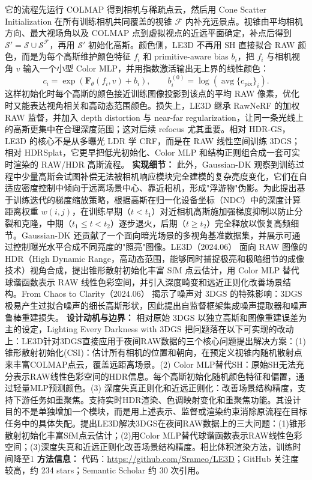 它的流程先运行 COLMAP 得到相机与稀疏点云，然后用 Cone Scatter Initialization 在所有训练相机共同覆盖的视锥 $\mathcal{F}$ 内补充远景点。视锥由平均相机方向、最大视场角以及 COLMAP 点到虚拟视点的近远平面确定，补点后得到 $\mathcal{S}'=\mathcal{S}\cup\mathcal{S}^{\mathcal{F}}$，再用 $\mathcal{S}'$ 初始化高斯。颜色侧，LE3D 不再用 SH 直接拟合 RAW 颜色，而是为每个高斯维护颜色特征 $f_i$ 和 primitive-aware bias $b_i$，把 $f_i$ 与相机视角 $v$ 输入一个小型 Color MLP，并用指数激活输出无上界的线性颜色：
\begin{equation}
c_i=\exp\left(\mathbf{F}_{\theta}(f_i,v)+b_i\right),\qquad
b_i^{(0)}=\log\left(\operatorname{avg}\{c_{\mathrm{pix}}\}_i\right).
\end{equation}
这样初始化时每个高斯的颜色接近训练图像投影到该点的平均 RAW 像素，优化时又能表达视角相关和高动态范围颜色。损失上，LE3D 继承 RawNeRF 的加权 RAW 监督，并加入 depth distortion 与 near-far regularization，让同一条光线上的高斯更集中在合理深度范围；这对后续 refocus 尤其重要。相对 HDR-GS，LE3D 的核心不是从多曝光 LDR 学 CRF，而是在 RAW 线性空间训练 3DGS；相对 HDRSplat，它更早把低光初始化、Color MLP 和结构正则组合成一套可实时渲染的 RAW/HDR 高斯流程。
\textbf{实现细节：} 此外，Gaussian-DK 观察到训练过程中少量高斯会试图补偿无法被相机响应模块完全建模的复杂亮度变化，它们在自适应密度控制中倾向于远离场景中心、靠近相机，形成"浮游物"伪影。为此提出基于训练迭代的梯度缩放策略，根据高斯在归一化设备坐标（NDC）中的深度计算距离权重 $w(i,j)$，在训练早期（$t < t_1$）对近相机高斯施加强梯度抑制以防止分裂和克隆，中期（$t_1 \leq t < t_2$）逐步退火，后期（$t \geq t_2$）完全释放以恢复高频细节。Gaussian-DK 还贡献了一个面向暗光场景的多视角基准数据集，并展示可通过控制曝光水平合成不同亮度的"照亮"图像。LE3D（2024.06） 面向 RAW 图像的 HDR（High Dynamic Range，高动态范围，能够同时捕捉极亮和极暗细节的成像技术）视角合成，提出锥形散射初始化丰富 SfM 点云估计，用 Color MLP 替代球谐函数表示 RAW 线性色彩空间，并引入深度畸变和远近正则化改善场景结构。From Chaos to Clarity（2024.06） 揭示了噪声对 3DGS 的特殊影响：3DGS 极易产生过拟合噪声的细长高斯形状，因此提出自监督框架集成噪声提取器和噪声鲁棒重建损失。
\textbf{设计动机与边界：} 相对原始 3DGS 以独立高斯和图像重建误差为主的设定，Lighting Every Darkness with 3DGS 把问题落在以下可实现的改动上：LE3D针对3DGS直接应用于夜间RAW数据的三个核心问题提出解决方案：(1) 锥形散射初始化(CSI)：估计所有相机的位置和朝向，在预定义视锥内随机散射点来丰富COLMAP点云，覆盖远距离场景。(2) Color MLP替代SH：原始SH无法充分表示RAW线性色彩空间的HDR信息。每个高斯初始化随机颜色特征和偏置，通过轻量MLP预测颜色。(3) 深度失真正则化和近远正则化：改善场景结构精度，支持下游任务如重聚焦。支持实时HDR渲染、色调映射变化和重聚焦功能。其设计目的不是单独增加一个模块，而是用上述表示、监督或渲染约束消除原流程在目标任务中的具体失配。提出LE3D解决3DGS在夜间RAW数据上的三大问题：(1)锥形散射初始化丰富SfM点云估计；(2)用Color MLP替代球谐函数表示RAW线性色彩空间；(3)深度失真和近远正则化改善场景结构精度。相比体积渲染方法，训练时间降至1%
\textbf{方法信息：} 代码：\url{https://github.com/Srameo/LE3D}；GitHub 关注度较高，约 234 stars；Semantic Scholar 约 30 次引用。



